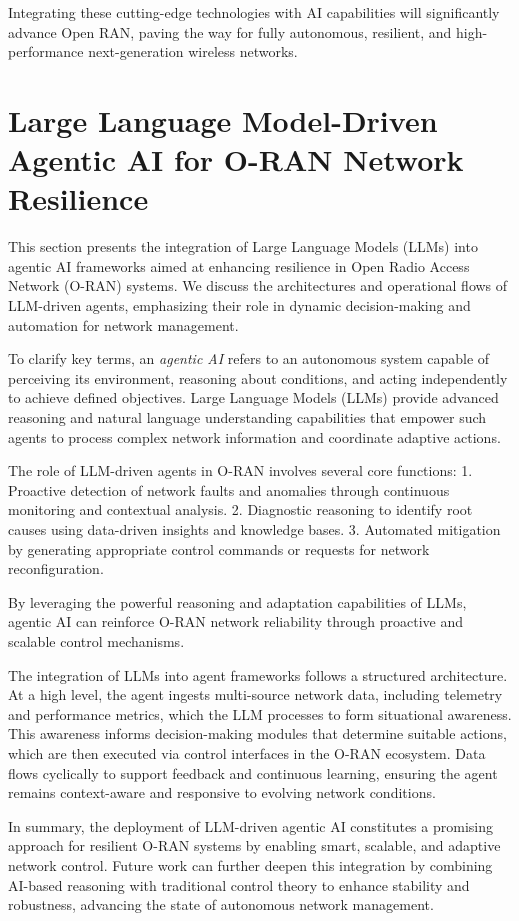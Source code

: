 \documentclass[sigconf]{acmart}
\begin{document}
Integrating these cutting-edge technologies with AI capabilities will significantly advance Open RAN, paving the way for fully autonomous, resilient, and high-performance next-generation wireless networks.

\section{Large Language Model-Driven Agentic AI for O-RAN Network Resilience}

This section presents the integration of Large Language Models (LLMs) into agentic AI frameworks aimed at enhancing resilience in Open Radio Access Network (O-RAN) systems. We discuss the architectures and operational flows of LLM-driven agents, emphasizing their role in dynamic decision-making and automation for network management.

To clarify key terms, an \textit{agentic AI} refers to an autonomous system capable of perceiving its environment, reasoning about conditions, and acting independently to achieve defined objectives. Large Language Models (LLMs) provide advanced reasoning and natural language understanding capabilities that empower such agents to process complex network information and coordinate adaptive actions.

The role of LLM-driven agents in O-RAN involves several core functions:
1. Proactive detection of network faults and anomalies through continuous monitoring and contextual analysis.
2. Diagnostic reasoning to identify root causes using data-driven insights and knowledge bases.
3. Automated mitigation by generating appropriate control commands or requests for network reconfiguration.

By leveraging the powerful reasoning and adaptation capabilities of LLMs, agentic AI can reinforce O-RAN network reliability through proactive and scalable control mechanisms.

The integration of LLMs into agent frameworks follows a structured architecture. At a high level, the agent ingests multi-source network data, including telemetry and performance metrics, which the LLM processes to form situational awareness. This awareness informs decision-making modules that determine suitable actions, which are then executed via control interfaces in the O-RAN ecosystem. Data flows cyclically to support feedback and continuous learning, ensuring the agent remains context-aware and responsive to evolving network conditions.

In summary, the deployment of LLM-driven agentic AI constitutes a promising approach for resilient O-RAN systems by enabling smart, scalable, and adaptive network control. Future work can further deepen this integration by combining AI-based reasoning with traditional control theory to enhance stability and robustness, advancing the state of autonomous network management.
\end{document}
